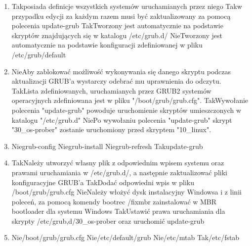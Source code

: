 \begin{enumerate}
	\item {}
	{Tak}{posiada definicje wszystkich systemów uruchamianych przez niego}
	{Tak}{w przypadku edycji za każdym razem musi być zaktualizowany za pomocą polecenia update-grub}
	{Tak}{Tworzony jest automatycznie na podstawie skryptów znajdujących się w katalogu /etc/grub.d/}
	{Nie}{Tworzony jest automatycznie na podstawie konfiguracji zdefiniowanej w pliku /etc/grub/default}
	
	\newpage

	\item {}
	{Nie}{Aby zablokować możliwość wykonywania się danego skryptu podczas aktualizacji GRUB'a wystarczy odebrać mu uprawnienia do odczytu.}
	{Tak}{Lista zdefiniowanych, uruchamianych przez GRUB2 systemów operacyjnych zdefiniowana jest w pliku "/boot/grub/grub.cfg".}
	{Tak}{Wywołanie polecenia "update-grub" powoduje uruchomienie skryptów umieszczonych w katalogu "/etc/grub.d"}
	{Nie}{Po wywołaniu polecenia "update-grub" skrypt "30\_os-prober" zostanie uruchomiony przed skryptem "10\_linux".}
	
	\item {}
	{Nie}{grub-config}
	{Nie}{grub-install}
	{Nie}{grub-refresh}
	{Tak}{update-grub}
	
	\item {}
	{Tak}{Należy utworzyć własny plik z odpowiednim wpisem systemu oraz prawami uruchamiania w /etc/grub.d/, a następnie zaktualizować pliki konfiguracyjne GRUB'a}
	{Tak}{Dodać odpowiedni wpis w pliku /boot/grub/grub.cfg}
	{Nie}{Należy włożyć dysk instalacyjny Windowsa i z linii poleceń, za pomocą komendy bootrec /fixmbr zainstalować w MBR bootloader dla systemu Windows}
	{Tak}{Ustawić prawa uruchamiania dla skrypty /etc/grub,d/30\_os-prober oraz uruchomić update-grub}

	\item {}
	{Nie}{/boot/grub/grub.cfg}
	{Nie}{/etc/default/grub}
	{Nie}{/etc/mtab}
	{Tak}{/etc/fstab}
	

\end{enumerate}
